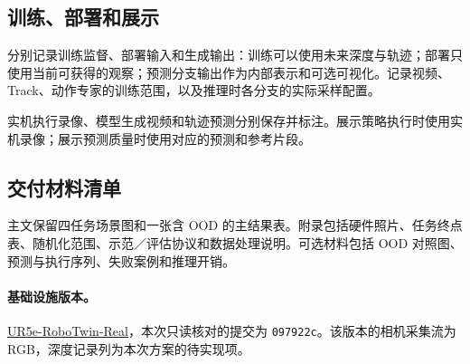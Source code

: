 \subsection{训练、部署和展示}
分别记录训练监督、部署输入和生成输出：训练可以使用未来深度与轨迹；部署只使用当前可获得的观察；预测分支输出作为内部表示和可选可视化。记录视频、Track、动作专家的训练范围，以及推理时各分支的实际采样配置。

实机执行录像、模型生成视频和轨迹预测分别保存并标注。展示策略执行时使用实机录像；展示预测质量时使用对应的预测和参考片段。

\subsection{交付材料清单}
主文保留四任务场景图和一张含 OOD 的主结果表。附录包括硬件照片、任务终点表、随机化范围、示范／评估协议和数据处理说明。可选材料包括 OOD 对照图、预测与执行序列、失败案例和推理开销。

\paragraph{基础设施版本。}\href{https://github.com/Yutenji-Nyamu/UR5e-RoboTwin-Real}{UR5e-RoboTwin-Real}，本次只读核对的提交为 \texttt{097922c}。该版本的相机采集流为 RGB，深度记录列为本次方案的待实现项。
